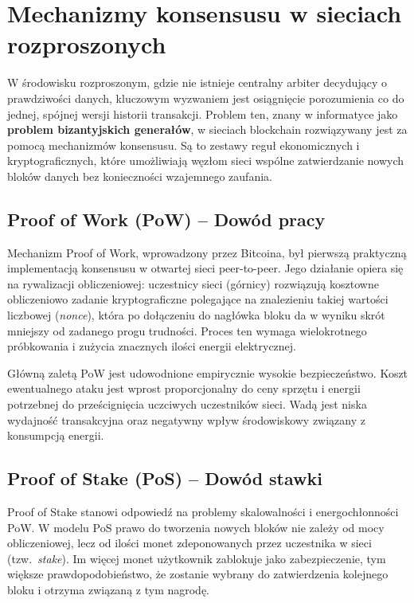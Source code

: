 \documentclass[12pt,a4paper,twoside]{report}
\begin{document}
\section{Mechanizmy konsensusu w sieciach rozproszonych}

W środowisku rozproszonym, gdzie nie istnieje centralny arbiter decydujący o prawdziwości
danych, kluczowym wyzwaniem jest osiągnięcie porozumienia co do jednej, spójnej wersji
historii transakcji. Problem ten, znany w informatyce jako \textbf{problem bizantyjskich
generałów}, w sieciach blockchain rozwiązywany jest za pomocą mechanizmów konsensusu.
Są to zestawy reguł ekonomicznych i kryptograficznych, które umożliwiają węzłom sieci
wspólne zatwierdzanie nowych bloków danych bez konieczności wzajemnego zaufania.

\subsection{Proof of Work (PoW) -- Dowód pracy}

Mechanizm Proof of Work, wprowadzony przez Bitcoina, był pierwszą praktyczną implementacją
konsensusu w otwartej sieci peer-to-peer. Jego działanie opiera się na rywalizacji
obliczeniowej: uczestnicy sieci (górnicy) rozwiązują kosztowne obliczeniowo zadanie
kryptograficzne polegające na znalezieniu takiej wartości liczbowej (\textit{nonce}),
która po dołączeniu do nagłówka bloku da w wyniku skrót mniejszy od zadanego progu
trudności. Proces ten wymaga wielokrotnego próbkowania i zużycia znacznych ilości energii
elektrycznej.

Główną zaletą PoW jest udowodnione empirycznie wysokie bezpieczeństwo. Koszt ewentualnego
ataku jest wprost proporcjonalny do ceny sprzętu i energii potrzebnej do prześcignięcia
uczciwych uczestników sieci. Wadą jest niska wydajność transakcyjna oraz negatywny wpływ
środowiskowy związany z konsumpcją energii.

\subsection{Proof of Stake (PoS) -- Dowód stawki}

Proof of Stake stanowi odpowiedź na problemy skalowalności i energochłonności PoW.
W modelu PoS prawo do tworzenia nowych bloków nie zależy od mocy obliczeniowej, lecz od
ilości monet zdeponowanych przez uczestnika w sieci (tzw.~\textit{stake}). Im więcej monet
użytkownik zablokuje jako zabezpieczenie, tym większe prawdopodobieństwo, że zostanie
wybrany do zatwierdzenia kolejnego bloku i otrzyma związaną z tym nagrodę.
\end{document}
